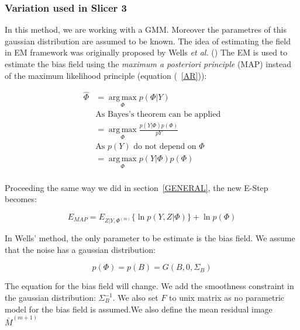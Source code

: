 \subsubsection{Variation used in Slicer 3}
In this method, we are working with a GMM. Moreover the parametres of this gaussian distribution are assumed to be known. The idea of estimating the field in EM framework was originally proposed by Wells \textit{et al.} (\cite{10}) The EM is used to estimate the bias field using the \textit{maximum a posteriori principle} (MAP) instead of the maximum likelihood principle (equation (~\ref{AR})):

\begin{align*}\label{ARMAP}
  \hat{\Phi} &=\operatorname*{arg\,max}_\Phi p(\Phi |Y)\\
             &\mbox{As Bayes's theorem can be applied} \\
             &=\operatorname*{arg\,max}_\Phi \frac{p(Y|\Phi)p(\Phi)}{p{Y}}\\  
             &\mbox{As $p(Y)$ do not depend on $\Phi$} \\
             &=\operatorname*{arg\,max}_\Phi p(Y|\Phi)p(\Phi)\\
  \end{align*}

Proceeding the same way we did in section~\ref{GENERAL}, the new E-Step becomes:

\begin{equation}\label{EMAP}
E_{MAP} = E_{Z|Y,\Phi^{(m)}}\{ \operatorname*{ln} p(Y,Z|\Phi) \} + \operatorname*{ln} p(\Phi)
\end{equation}

In Wells' method, the only parameter to be estimate is the bias field. We assume that the noise has a gaussian distribution:

  \begin{equation*}
  p(\Phi) = p(B) = G(B,0,\Sigma_B)
  \end{equation*}
  
The equation for the bias field will change. We add the smoothness constraint in the gaussian distribution: $\Sigma_B^{-1}$. We also set $F$ to unix matrix as no parametric model for the bias field is assumed.We also define the mean residual image $\bar{M}^{(m+1)}$


